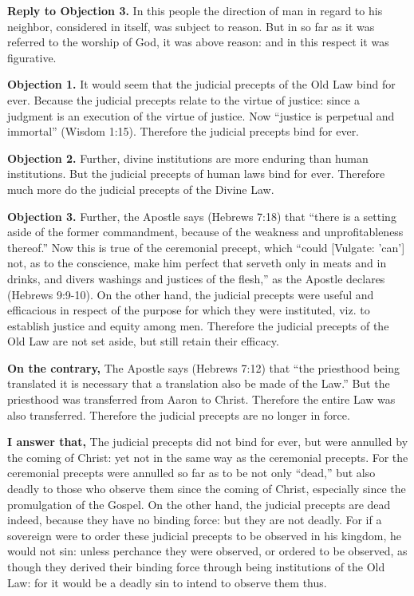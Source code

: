 \textbf{Reply to Objection 3.} In this people the direction of man in regard to his neighbor, considered in itself, was subject to reason. But in so far as it was referred to the worship of God, it was above reason: and in this respect it was figurative.


\textbf{Objection 1.} It would seem that the judicial precepts of the Old Law bind for ever. Because the judicial precepts relate to the virtue of justice: since a judgment is an execution of the virtue of justice. Now ``justice is perpetual and immortal'' (Wisdom 1:15). Therefore the judicial precepts bind for ever.

\textbf{Objection 2.} Further, divine institutions are more enduring than human institutions. But the judicial precepts of human laws bind for ever. Therefore much more do the judicial precepts of the Divine Law.

\textbf{Objection 3.} Further, the Apostle says (Hebrews 7:18) that ``there is a setting aside of the former commandment, because of the weakness and unprofitableness thereof.'' Now this is true of the ceremonial precept, which ``could [Vulgate: 'can'] not, as to the conscience, make him perfect that serveth only in meats and in drinks, and divers washings and justices of the flesh,'' as the Apostle declares (Hebrews 9:9-10). On the other hand, the judicial precepts were useful and efficacious in respect of the purpose for which they were instituted, viz. to establish justice and equity among men. Therefore the judicial precepts of the Old Law are not set aside, but still retain their efficacy.

\textbf{On the contrary,} The Apostle says (Hebrews 7:12) that ``the priesthood being translated it is necessary that a translation also be made of the Law.'' But the priesthood was transferred from Aaron to Christ. Therefore the entire Law was also transferred. Therefore the judicial precepts are no longer in force.

\textbf{I answer that,} The judicial precepts did not bind for ever, but were annulled by the coming of Christ: yet not in the same way as the ceremonial precepts. For the ceremonial precepts were annulled so far as to be not only ``dead,'' but also deadly to those who observe them since the coming of Christ, especially since the promulgation of the Gospel. On the other hand, the judicial precepts are dead indeed, because they have no binding force: but they are not deadly. For if a sovereign were to order these judicial precepts to be observed in his kingdom, he would not sin: unless perchance they were observed, or ordered to be observed, as though they derived their binding force through being institutions of the Old Law: for it would be a deadly sin to intend to observe them thus.

